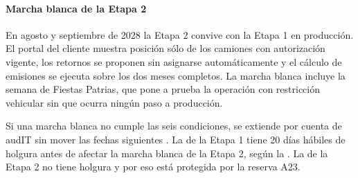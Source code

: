 \paragraph{Marcha blanca de la Etapa 2}
En agosto y septiembre de 2028 la Etapa 2 convive con la Etapa 1 en producción. El portal del cliente
muestra posición sólo de los camiones con autorización vigente, los retornos se proponen sin asignarse
automáticamente y el cálculo de emisiones se ejecuta sobre los dos meses completos. La marcha blanca
incluye la semana de Fiestas Patrias, que pone a prueba la operación con restricción vehicular sin que
ocurra ningún paso a producción.

Si una marcha blanca no cumple las seis condiciones, se extiende por cuenta de audIT sin mover las fechas
siguientes . La de la Etapa 1 tiene 20 días hábiles de holgura antes de afectar la marcha
blanca de la Etapa 2, según la . La de la Etapa 2 no tiene holgura y por eso está
protegida por la reserva A23.
